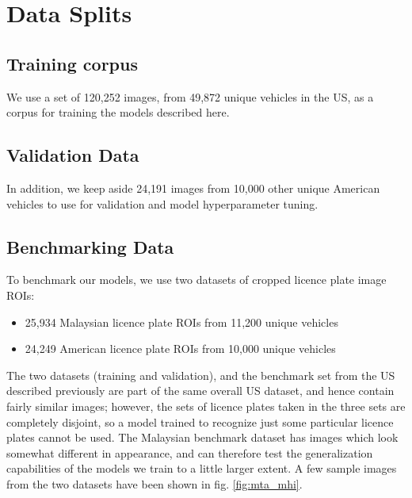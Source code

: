 \documentclass[10pt,twocolumn,letterpaper]{article}
\begin{document}
\section{Data Splits \label{sec:data_splits}}

    \subsection{Training corpus \label{sec:data_splits:training_corpus}}
        We use a set of 120,252 images, from 49,872 unique vehicles in the US, as a corpus for training the models described here. 
    
    \subsection{Validation Data \label{sec:data_splits:validation_data}}
        In addition, we keep aside 24,191 images from 10,000 other unique American vehicles to use for validation and model hyperparameter tuning. 

    \subsection{Benchmarking Data \label{sec:data_splits:benchmark_data}}
        To benchmark our models, we use two datasets of cropped licence plate image ROIs:
        \begin{itemize}
        	\item 25,934 Malaysian licence plate ROIs from 11,200 unique vehicles
        	\item 24,249 American licence plate ROIs from 10,000 unique vehicles
        \end{itemize}
        The two datasets (training and validation), and the benchmark set from the US described previously are part of the same overall US dataset, and hence contain fairly similar images; however, the sets of licence plates taken in the three sets are completely disjoint, so a model trained to recognize just some particular licence plates cannot be used. The Malaysian benchmark dataset has images which look somewhat different in appearance, and can therefore test the generalization capabilities of the models we train to a little larger extent. A few sample images from the two datasets have been shown in fig. \ref{fig:mta_mhi}.
\end{document}
